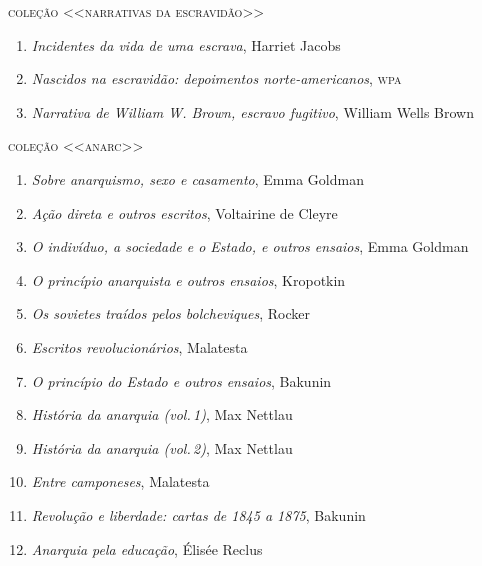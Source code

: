 \pagebreak
{\large\textsc{coleção <<narrativas da escravidão>>}}

\begin{enumerate}
\setlength\parskip{4.2pt}
\setlength\itemsep{-1.4mm}
\item \textit{Incidentes da vida de uma escrava}, Harriet Jacobs
\item \textit{Nascidos na escravidão: depoimentos norte-americanos}, \textsc{wpa}
\item \textit{Narrativa de William W. Brown, escravo fugitivo}, William Wells Brown
\end{enumerate}

\medskip
{\large\textsc{coleção <<anarc>>}}

\begin{enumerate}
\setlength\parskip{4.2pt}
\setlength\itemsep{-1.4mm}
\item \textit{Sobre anarquismo, sexo e casamento}, Emma Goldman
\item \textit{Ação direta e outros escritos}, Voltairine de Cleyre
\item \textit{O indivíduo, a sociedade e o Estado, e outros ensaios}, Emma Goldman
\item \textit{O princípio anarquista e outros ensaios}, Kropotkin
\item \textit{Os sovietes traídos pelos bolcheviques}, Rocker
\item \textit{Escritos revolucionários}, Malatesta
\item \textit{O princípio do Estado e outros ensaios}, Bakunin
\item \textit{História da anarquia (vol.\,1)}, Max Nettlau
\item \textit{História da anarquia (vol.\,2)}, Max Nettlau
\item \textit{Entre camponeses}, Malatesta
\item \textit{Revolução e liberdade: cartas de 1845 a 1875}, Bakunin
\item \textit{Anarquia pela educação}, Élisée Reclus 
\end{enumerate}

\pagebreak